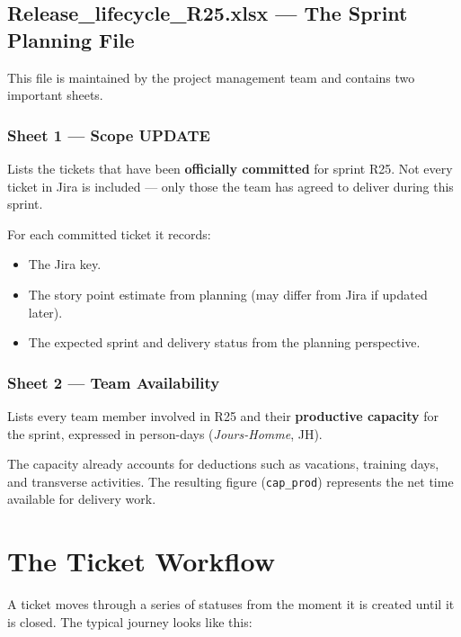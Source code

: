 \documentclass[12pt, a4paper]{article}
\begin{document}
\subsection{Release\_lifecycle\_R25.xlsx --- The Sprint Planning File}

This file is maintained by the project management team and contains two
important sheets.

\subsubsection*{Sheet 1 --- Scope UPDATE}

Lists the tickets that have been \textbf{officially committed} for sprint R25.
Not every ticket in Jira is included --- only those the team has agreed to
deliver during this sprint.

For each committed ticket it records:
\begin{itemize}
  \item The Jira key.
  \item The story point estimate from planning (may differ from Jira if updated later).
  \item The expected sprint and delivery status from the planning perspective.
\end{itemize}

\subsubsection*{Sheet 2 --- Team Availability}

Lists every team member involved in R25 and their \textbf{productive capacity}
for the sprint, expressed in person-days (\emph{Jours-Homme}, JH).

The capacity already accounts for deductions such as vacations, training
days, and transverse activities. The resulting figure (\texttt{cap\_prod})
represents the net time available for delivery work.

\section{The Ticket Workflow}
\label{sec:workflow}

A ticket moves through a series of statuses from the moment it is created
until it is closed. The typical journey looks like this:
\end{document}
